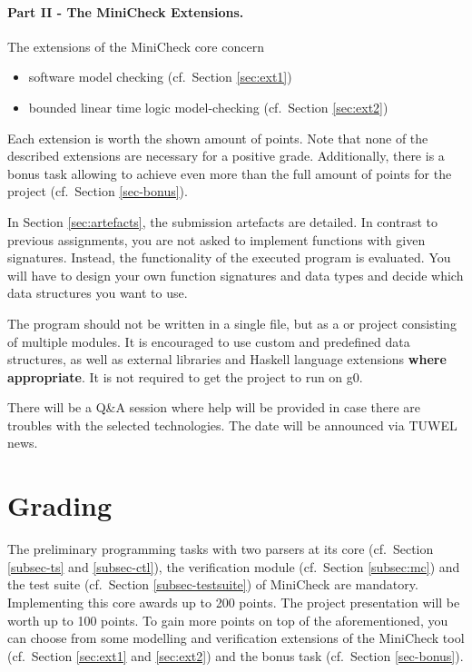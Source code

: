 \documentclass{article}
\begin{document}
\paragraph{Part II - The MiniCheck Extensions.} The extensions of the MiniCheck core concern 
\begin{itemize}
    \item software model checking (cf.~Section \ref{sec:ext1})
    \item bounded linear time logic model-checking (cf.~Section \ref{sec:ext2})
\end{itemize}
Each extension is worth the shown amount of points. Note that none of the described extensions are necessary for a positive grade. Additionally, there is a bonus task allowing to achieve even more than the full amount of points for the project (cf.~Section \ref{sec-bonus}). 
\bigskip

In Section \ref{sec:artefacts}, the submission artefacts are detailed. In contrast to previous assignments, you are not asked to implement functions with given signatures. 
Instead, the functionality of the executed program is evaluated. 
You will have to design your own function signatures and data types and decide 
which data structures you want to use.

The program should not be written in a single file, but as a \href{https://docs.haskellstack.org/en/stable/README/}{} 
or \href{https://cabal.readthedocs.io/en/3.4/}{} project consisting of multiple modules. 
It is encouraged to use custom and predefined data structures, as well as external libraries 
and Haskell language extensions \textbf{where appropriate}. It is not required to get the project to run on g0.

There will be a Q\&A session where help will be provided in case there are troubles with the selected technologies. 
The date will be announced via TUWEL news.

\section{Grading}

The preliminary programming tasks with two parsers at its core (cf.~Section \ref{subsec-ts} and \ref{subsec-ctl}), the verification module (cf.~Section \ref{subsec:mc}) 
and the test suite (cf.~Section \ref{subsec-testsuite}) of MiniCheck are mandatory. 
Implementing this core awards up to 200 points. The project presentation will be worth up to 100 points. 
To gain more points on top of the aforementioned, you can choose from some modelling 
and verification extensions of the MiniCheck tool (cf.~Section \ref{sec:ext1} and \ref{sec:ext2}) and the bonus task (cf.~Section \ref{sec-bonus}).
\end{document}
